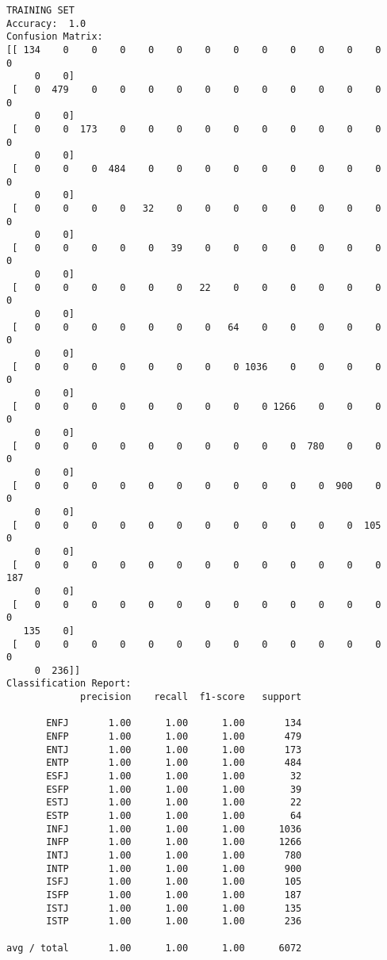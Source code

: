 \documentclass[11pt]{article}
\begin{document}
    \begin{Verbatim}[commandchars=\\\{\}]
TRAINING SET
Accuracy:  1.0
Confusion Matrix:
[[ 134    0    0    0    0    0    0    0    0    0    0    0    0    0
     0    0]
 [   0  479    0    0    0    0    0    0    0    0    0    0    0    0
     0    0]
 [   0    0  173    0    0    0    0    0    0    0    0    0    0    0
     0    0]
 [   0    0    0  484    0    0    0    0    0    0    0    0    0    0
     0    0]
 [   0    0    0    0   32    0    0    0    0    0    0    0    0    0
     0    0]
 [   0    0    0    0    0   39    0    0    0    0    0    0    0    0
     0    0]
 [   0    0    0    0    0    0   22    0    0    0    0    0    0    0
     0    0]
 [   0    0    0    0    0    0    0   64    0    0    0    0    0    0
     0    0]
 [   0    0    0    0    0    0    0    0 1036    0    0    0    0    0
     0    0]
 [   0    0    0    0    0    0    0    0    0 1266    0    0    0    0
     0    0]
 [   0    0    0    0    0    0    0    0    0    0  780    0    0    0
     0    0]
 [   0    0    0    0    0    0    0    0    0    0    0  900    0    0
     0    0]
 [   0    0    0    0    0    0    0    0    0    0    0    0  105    0
     0    0]
 [   0    0    0    0    0    0    0    0    0    0    0    0    0  187
     0    0]
 [   0    0    0    0    0    0    0    0    0    0    0    0    0    0
   135    0]
 [   0    0    0    0    0    0    0    0    0    0    0    0    0    0
     0  236]]
Classification Report:
             precision    recall  f1-score   support

       ENFJ       1.00      1.00      1.00       134
       ENFP       1.00      1.00      1.00       479
       ENTJ       1.00      1.00      1.00       173
       ENTP       1.00      1.00      1.00       484
       ESFJ       1.00      1.00      1.00        32
       ESFP       1.00      1.00      1.00        39
       ESTJ       1.00      1.00      1.00        22
       ESTP       1.00      1.00      1.00        64
       INFJ       1.00      1.00      1.00      1036
       INFP       1.00      1.00      1.00      1266
       INTJ       1.00      1.00      1.00       780
       INTP       1.00      1.00      1.00       900
       ISFJ       1.00      1.00      1.00       105
       ISFP       1.00      1.00      1.00       187
       ISTJ       1.00      1.00      1.00       135
       ISTP       1.00      1.00      1.00       236

avg / total       1.00      1.00      1.00      6072



\end{Verbatim}
\end{document}

